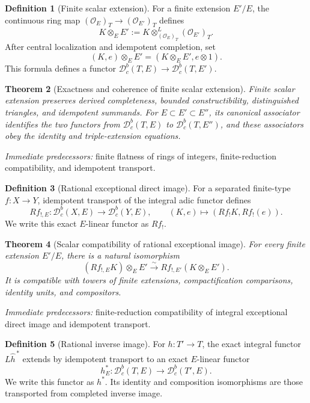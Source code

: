 \documentclass[10pt]{article}
\newtheorem{theorem}{Theorem}[section]
\theoremstyle{definition}
\newtheorem{definition}[theorem]{Definition}
\newcommand{\Dbc}{\mathcal D^b_c}
\newcommand{\pred}[1]{\par\smallskip\begingroup\footnotesize\raggedright
\emph{Immediate predecessors:} #1.\par\endgroup}
\begin{document}
\begin{definition}[Finite scalar extension]
For a finite extension \(E'/E\), the continuous ring map
\((\mathcal O_E)_T\to(\mathcal O_{E'})_T\) defines
\[
 K\otimes_EE':=
 K\otimes^L_{(\mathcal O_E)_T}(\mathcal O_{E'})_T.
\]
After central localization and idempotent completion, set
\[
 (K,e)\otimes_EE'=
 (K\otimes_EE',e\otimes 1).
\]
This formula defines a functor
\(\Dbc(T,E)\to\Dbc(T,E')\).
\end{definition}

\begin{theorem}[Exactness and coherence of finite scalar extension]
Finite scalar extension preserves derived completeness, bounded
constructibility, distinguished triangles, and idempotent summands.  For
\(E\subset E'\subset E''\), its canonical associator identifies the two
functors from \(\Dbc(T,E)\) to \(\Dbc(T,E'')\), and these associators obey
the identity and triple-extension equations.
\end{theorem}
\pred{finite flatness of rings of integers, finite-reduction compatibility, and idempotent transport}

\begin{definition}[Rational exceptional direct image]
For a separated finite-type \(f:X\to Y\), idempotent transport of the
integral adic functor defines
\[
 Rf_{!,E}:\Dbc(X,E)\longrightarrow\Dbc(Y,E),
 \qquad
 (K,e)\longmapsto(Rf_!K,Rf_!(e)).
\]
We write this exact \(E\)-linear functor as \(Rf_!\).
\end{definition}

\begin{theorem}[Scalar compatibility of rational exceptional image]
For every finite extension \(E'/E\), there is a natural isomorphism
\[
 (Rf_{!,E}K)\otimes_EE'
 \xrightarrow{\sim}
 Rf_{!,E'}(K\otimes_EE').
\]
It is compatible with towers of finite extensions, compactification
comparisons, identity units, and compositors.
\end{theorem}
\pred{finite-reduction compatibility of integral exceptional direct image and idempotent transport}

\begin{definition}[Rational inverse image]
For \(h:T'\to T\), the exact integral functor
\(L\widehat h^{\,*}\) extends by idempotent transport to an exact
\(E\)-linear functor
\[
 h_E^*:\Dbc(T,E)\longrightarrow\Dbc(T',E).
\]
We write this functor as \(h^*\).  Its identity and composition
isomorphisms are those transported from completed inverse image.
\end{definition}
\end{document}
